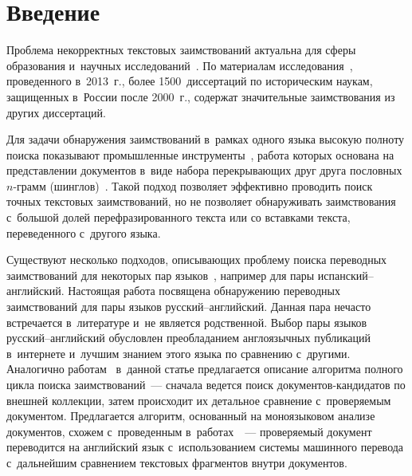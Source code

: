 




\thispagestyle{headings}

\begin{multicols}{2}

\label{st\stat}

\section{Введение}

\vspace*{-2pt}

Проблема некорректных текстовых заимствований актуальна для сферы образования 
и~научных исследований~\cite{plag_cheh}. По материалам исследования~\cite{hist}, 
проведенного в~2013~г., более 1500~диссертаций по историческим наукам, 
защищенных в~России после 2000~г., содержат значительные заимствования из 
других диссертаций.

Для задачи обнаружения заимствований в~рамках одного языка высокую полноту 
поиска показывают промышленные инструменты~\cite{plag_cheh}, работа которых 
основана на представлении документов в~виде набора перекрывающих друг друга 
пословных $n$-грамм (шинглов)~\cite{shingles1}. Такой подход позволяет 
эффективно проводить поиск точных текстовых заимствований, но не позволяет 
обнаруживать заимствования с~большой долей перефразированного текста или со 
вставками  текста, переведенного с~другого языка.

Существуют несколько подходов, опи\-сы\-ва\-ющих проб\-ле\-му поиска переводных 
заимствований для некоторых пар языков~\cite{clkga,clfreshonto}, например для 
пары ис\-пан\-ский--анг\-лий\-ский. Настоящая работа посвящена обнаружению переводных 
заимствований для пары языков рус\-ский--анг\-лий\-ский. Данная пара нечасто 
встречается в~литературе и~не является родственной. Выбор пары языков рус\-ский--анг\-лий\-ский 
обуслов\-лен преобладанием англоязычных пуб\-ли\-ка\-ций в~интернете 
и~лучшим знанием этого языка по сравнению с~другими. Аналогично 
работам~\cite{framework1,framework2} в~данной статье предлагается описание 
алгоритма полного цик\-ла поиска заимствований~--- сначала ведется поиск 
до\-ку\-мен\-тов-кан\-ди\-да\-тов по внешней коллекции, затем происходит их детальное 
сравнение с~проверяемым документом. Предлагается алгоритм, основанный на 
моноязыковом анализе документов, схожем с~проведенным 
в~работах~\cite{mono,fruct}~--- про\-ве\-ря\-емый документ переводится на английский 
язык с~использованием системы машинного перевода с~дальнейшим сравнением 
текс\-то\-вых фрагментов внут\-ри документов.


\end{multicols}
